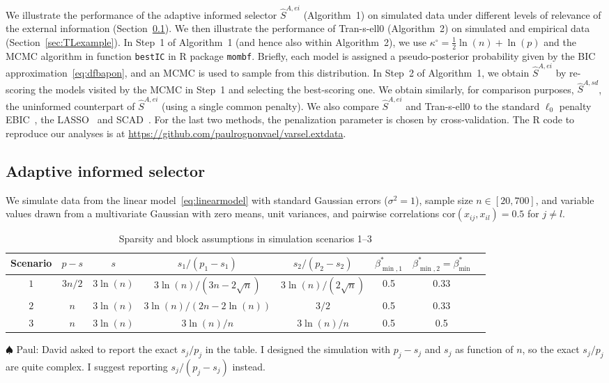 \documentclass[
  12pt]{article}
\newcommand{\paul}[1]{{\small{\color{green} \sf $\spadesuit$ Paul: #1}}}
\begin{document}
We illustrate the performance of the adaptive informed selector $\hat{S}^{A,ei}$ (Algorithm~1) on simulated data under different levels of relevance of the external information (Section~\ref{sec:simulationsss}).
We then illustrate the performance of Tran-s-ell0 (Algorithm~2) on simulated and empirical data (Section~\ref{sec:TLexample}).
In Step~1 of Algorithm~1 (and hence also within Algorithm~2), we use $\kappa^{\circ}=\tfrac12\ln(n)+\ln(p)$ and
the MCMC algorithm in function \texttt{bestIC} in R package \texttt{mombf}. Briefly, each model is assigned a
pseudo-posterior probability given by the BIC approximation~\eqref{eq:dfbapon}, and an MCMC is used to sample from this distribution. 
In Step~2 of Algorithm~1, we obtain $\hat S^{A,ei}$ by re-scoring the models visited by the MCMC in Step~1 and selecting the best-scoring one. We obtain similarly, for comparison purposes, $\hat S^{A,sd}$, the uninformed counterpart of $\hat{S}^{A,ei}$ (using a single common penalty). We also compare $\hat S^{A,ei}$ and Tran-s-ell0 to the standard $\ell_0$ penalty EBIC~\citep{EBIC}, the LASSO~\citep{lasso} and SCAD~\citep{Fan01SCAD}. For the last two methods, the penalization parameter is chosen by cross-validation. The R code to reproduce our analyses is at 
\url{https://github.com/paulrognonvael/varsel.extdata}.


\subsection{Adaptive informed selector}\label{sec:simulationsss}

We simulate data from the linear model~\eqref{eq:linearmodel} with standard Gaussian errors ($\sigma^2=1$), sample size $n \in [20,700]$, and variable values drawn from a multivariate Gaussian with zero means, unit variances, and pairwise correlations $\mbox{cor}(x_{ij}, x_{il})= 0.5$ for $j \neq l$.

\begin{table}[ht]
\caption{Sparsity and block assumptions in simulation scenarios 1--3}
\label{tab:examples_bis}
\begin{center}
\begin{tabular}[]{@{}cccccccc@{}}
\hline
Scenario & $p-s$ & $s$ &\color{green} $s_1/(p_1-s_1)$ &\color{green} $s_2/(p_2-s_2)$ & $\beta_{\min,1}^*$ & $\beta_{\min,2}^*=\beta_{\min}^*$ \\
\hline
$1$    & $3n/2$ & $3\ln(n)$ & $3\ln(n)/(3n-2\sqrt{n})$ & $3\ln(n)/(2\sqrt{n})$  & 0.5 & 0.33\\
$2$    & $n$ & $3\ln(n)$ & $3\ln(n)/(2n-2\ln(n))$ & $3/2$   & 0.5 & 0.33 \\
$3$    & $n$ & $3\ln(n)$ & $3\ln(n)/n$ & $3\ln(n)/n$  & 0.5 & 0.5\\
\hline
\end{tabular}
\end{center}
\end{table}
\paul{David asked to report the exact $s_j/p_j$ in the table. I designed the simulation with $p_j-s_j$ and $s_j$ as function of $n$, so the exact $s_j/p_j$ are quite complex. I suggest reporting $s_j/(p_j-s_j)$ instead.}
\end{document}
